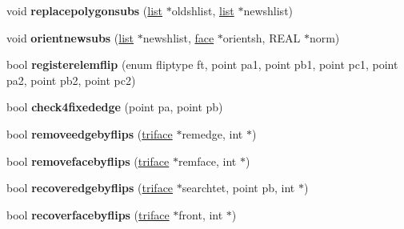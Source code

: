 \begin{DoxyCompactItemize}
\item 
\hypertarget{classtetgenmesh_a2b88316cdfdbc36309b6f2836b7d376a}{void {\bfseries replacepolygonsubs} (\hyperlink{classtetgenmesh_1_1list}{list} $\ast$oldshlist, \hyperlink{classtetgenmesh_1_1list}{list} $\ast$newshlist)}\label{classtetgenmesh_a2b88316cdfdbc36309b6f2836b7d376a}

\item 
\hypertarget{classtetgenmesh_a0d77d6551219d924decbad440aeccb0c}{void {\bfseries orientnewsubs} (\hyperlink{classtetgenmesh_1_1list}{list} $\ast$newshlist, \hyperlink{classtetgenmesh_1_1face}{face} $\ast$orientsh, R\-E\-A\-L $\ast$norm)}\label{classtetgenmesh_a0d77d6551219d924decbad440aeccb0c}

\item 
\hypertarget{classtetgenmesh_a546af73c1adc0043ea83a587a13e2423}{bool {\bfseries registerelemflip} (enum fliptype ft, point pa1, point pb1, point pc1, point pa2, point pb2, point pc2)}\label{classtetgenmesh_a546af73c1adc0043ea83a587a13e2423}

\item 
\hypertarget{classtetgenmesh_aaf180be3f6298962401df75b6aca2079}{bool {\bfseries check4fixededge} (point pa, point pb)}\label{classtetgenmesh_aaf180be3f6298962401df75b6aca2079}

\item 
\hypertarget{classtetgenmesh_a462a060acfc62cae33d675fd38b33ba1}{bool {\bfseries removeedgebyflips} (\hyperlink{classtetgenmesh_1_1triface}{triface} $\ast$remedge, int $\ast$)}\label{classtetgenmesh_a462a060acfc62cae33d675fd38b33ba1}

\item 
\hypertarget{classtetgenmesh_a98cbfef8f1045cf4e7c9f5622b672076}{bool {\bfseries removefacebyflips} (\hyperlink{classtetgenmesh_1_1triface}{triface} $\ast$remface, int $\ast$)}\label{classtetgenmesh_a98cbfef8f1045cf4e7c9f5622b672076}

\item 
\hypertarget{classtetgenmesh_a3996b1ef6cf9b5ed2f3e36697f257f69}{bool {\bfseries recoveredgebyflips} (\hyperlink{classtetgenmesh_1_1triface}{triface} $\ast$searchtet, point pb, int $\ast$)}\label{classtetgenmesh_a3996b1ef6cf9b5ed2f3e36697f257f69}

\item 
\hypertarget{classtetgenmesh_a86efafcfdd4e403567f323c6a3973fe0}{bool {\bfseries recoverfacebyflips} (\hyperlink{classtetgenmesh_1_1triface}{triface} $\ast$front, int $\ast$)}\label{classtetgenmesh_a86efafcfdd4e403567f323c6a3973fe0}


\end{DoxyCompactItemize}
